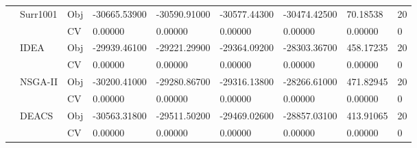 \begin{table*}[!htb]
\begin{tabular}{lllllllll}
		& Surr1001                           & Obj                                & -30665.53900                       & -30590.91000                       & -30577.44300                         & -30474.42500                        & 70.18538                          & 20               \\
		&                                    & CV                                 & 0.00000                            & 0.00000                            & 0.00000                              & 0.00000                             & 0.00000                           & 0                \\
		& IDEA                               & Obj                                & -29939.46100                       & -29221.29900                       & -29364.09200                         & -28303.36700                        & 458.17235                         & 20               \\
		&                                    & CV                                 & 0.00000                            & 0.00000                            & 0.00000                              & 0.00000                             & 0.00000                           & 0                \\
		& NSGA-II                            & Obj                                & -30200.41000                       & -29280.86700                       & -29316.13800                         & -28266.61000                        & 471.82945                         & 20               \\
		&                                    & CV                                 & 0.00000                            & 0.00000                            & 0.00000                              & 0.00000                             & 0.00000                           & 0                \\
		& DEACS                              & Obj                                & -30563.31800                       & -29511.50200                       & -29469.02600                         & -28857.03100                        & 413.91065                         & 20               \\
		&                                    & CV                                 & 0.00000                            & 0.00000                            & 0.00000                              & 0.00000                             & 0.00000                           & 0                \\

\end{tabular}
\end{table*}
